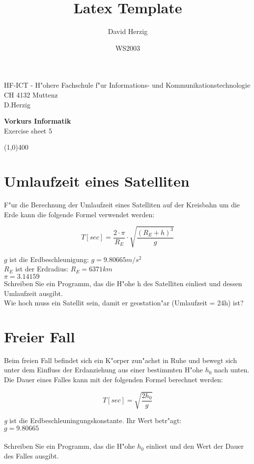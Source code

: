 \documentclass[a4paper,10pt]{article}
\title{Latex Template}
\author{David Herzig}
\date{WS2003}
\begin{document}
HF-ICT - H"ohere Fachschule f"ur Informations- und Kommunikationstechnologie\\
CH 4132 Muttenz\\
D.Herzig

\vspace{2mm}

\begin{center}
{\Large \bf Vorkurs Informatik}\\
Exercise sheet 5
\end{center}

\vspace{2mm}

\line(1,0){400}

\vspace{5mm}

\section{Umlaufzeit eines Satelliten}
F"ur die Berechnung der Umlaufzeit eines Satelliten auf der Kreisbahn um die
Erde kann die folgende Formel verwendet werden:

\begin{displaymath}
T[sec] = \frac{2 \cdot \pi}{R_{E}} \cdot \sqrt{\frac{(R_{E}+h)^{3}}{g}}
\end{displaymath}

$g$ ist die Erdbeschleunigung: $g = 9.80665 m/s^{2}$\\
$R_{E}$ ist der Erdradius: $R_{E} = 6371 km$\\
$\pi = 3.14159$\\

Schreiben Sie ein Programm, das die H"ohe h des Satelliten einliest und dessen
Umlaufzeit ausgibt.\\
Wie hoch muss ein Satellit sein, damit er geostation"ar (Umlaufzeit = 24h) ist?


\section{Freier Fall}
Beim freien Fall befindet sich ein K"orper zun"achst in Ruhe und bewegt sich
unter dem Einfluss der Erdanziehung aus einer bestimmten H"ohe $h_0$ nach unten. Die
Dauer eines Falles kann mit der folgenden Formel berechnet werden:

\begin{displaymath}
T [sec] = \sqrt{\frac{2h_0}{g}}
\end{displaymath}

\emph{g} ist die Erdbeschleuningungskonstante. Ihr Wert betr"agt:\\
$g=9.80665$\\
\\
Schreiben Sie ein Programm, das die H"ohe $h_0$ einliest und den Wert der
Dauer des Falles ausgibt.
\end{document}
